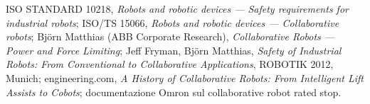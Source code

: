 \begin{note}[Riferimenti]
ISO STANDARD 10218, \emph{Robots and robotic devices — Safety requirements for industrial robots}; ISO/TS 15066, \emph{Robots and robotic devices — Collaborative robots}; Björn Matthias (ABB Corporate Research), \emph{Collaborative Robots — Power and Force Limiting}; Jeff Fryman, Björn Matthias, \emph{Safety of Industrial Robots: From Conventional to Collaborative Applications}, ROBOTIK 2012, Munich; engineering.com, \emph{A History of Collaborative Robots: From Intelligent Lift Assists to Cobots}; documentazione Omron sul collaborative robot rated stop.
\end{note}
